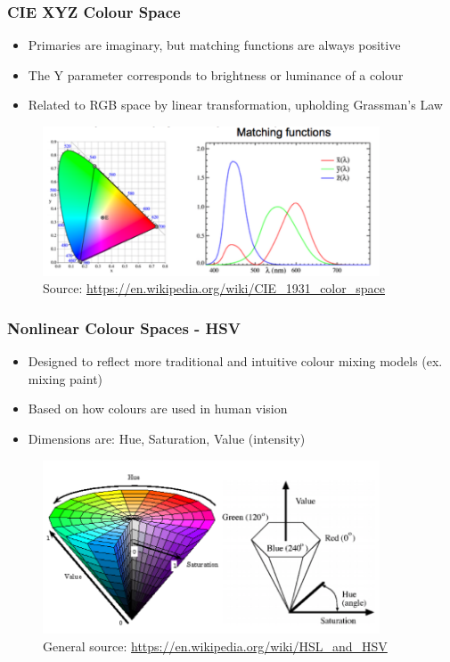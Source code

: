 \documentclass[letterpaper,12pt]{article}
\begin{document}
\subsubsection{CIE XYZ Colour Space}
\begin{itemize}
 \item Primaries are imaginary, but matching functions are always positive
 \item The Y parameter corresponds to brightness or luminance of a colour
 \item Related to RGB space by linear transformation, upholding Grassman's Law
\end{itemize}
\begin{figure}[H]
 \centering
 \includegraphics[width=10cm]{images/ciexyz.png}
 \caption{Source: \url{https://en.wikipedia.org/wiki/CIE_1931_color_space}}
\end{figure}


\subsubsection{Nonlinear Colour Spaces - HSV}
\begin{itemize}
 \item Designed to reflect more traditional and intuitive colour mixing models (ex. mixing paint)
 \item Based on how colours are used in human vision
 \item Dimensions are: Hue, Saturation, Value (intensity)
\end{itemize}
\begin{figure}[H]
 \centering
 \includegraphics[width=10cm]{images/hsv.png}
 \caption{General source: \url{https://en.wikipedia.org/wiki/HSL_and_HSV}}
\end{figure}
\end{document}
